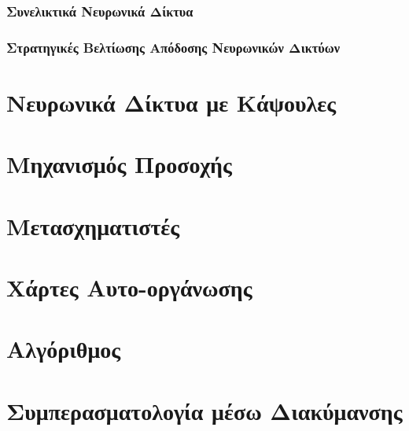 \subsubsection{Συνελικτικά Νευρωνικά Δίκτυα}

\subsubsection{Στρατηγικές Βελτίωσης Απόδοσης Νευρωνικών Δικτύων}
\section{Νευρωνικά Δίκτυα με Κάψουλες}
\section{Μηχανισμός Προσοχής}
\section{Μετασχηματιστές}
\section{Χάρτες Αυτο-οργάνωσης}
\label{sec:_SOM}
\section{Αλγόριθμος }
\label{sec:_EM}
\section{Συμπερασματολογία μέσω Διακύμανσης}
